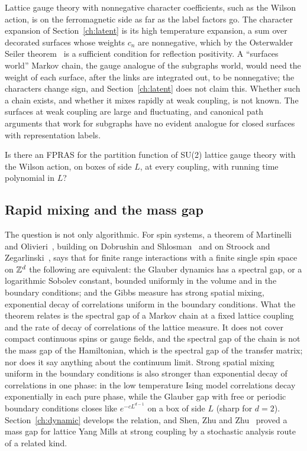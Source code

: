 Lattice gauge theory with nonnegative character coefficients, such as the Wilson action, is on the ferromagnetic side as far as the label factors go. The character expansion of Section~\ref{ch:latent} is its high temperature expansion, a sum over decorated surfaces whose weights $c_n$ are nonnegative, which by the Osterwalder Seiler theorem~\cite{OSe} is a sufficient condition for reflection positivity. A ``surfaces world'' Markov chain, the gauge analogue of the subgraphs world, would need the weight of each surface, after the links are integrated out, to be nonnegative; the characters change sign, and Section~\ref{ch:latent} does not claim this. Whether such a chain exists, and whether it mixes rapidly at weak coupling, is not known. The surfaces at weak coupling are large and fluctuating, and canonical path arguments that work for subgraphs have no evident analogue for closed surfaces with representation labels.

\begin{problem}\label{op:mixing1}
Is there an FPRAS for the partition function of SU(2) lattice gauge theory with the Wilson action, on boxes of side $L$, at every coupling, with running time polynomial in $L$?
\end{problem}

\subsection{Rapid mixing and the mass gap}

The question is not only algorithmic. For spin systems, a theorem of Martinelli and Olivieri~\cite{MO94}, building on Dobrushin and Shlosman~\cite{DS85,DS87} and on Stroock and Zegarlinski~\cite{SZ92}, says that for finite range interactions with a finite single spin space on $\mathbb{Z}^d$ the following are equivalent: the Glauber dynamics has a spectral gap, or a logarithmic Sobolev constant, bounded uniformly in the volume and in the boundary conditions; and the Gibbs measure has strong spatial mixing, exponential decay of correlations uniform in the boundary conditions. What the theorem relates is the spectral gap of a Markov chain at a fixed lattice coupling and the rate of decay of correlations of the lattice measure. It does not cover compact continuous spins or gauge fields, and the spectral gap of the chain is not the mass gap of the Hamiltonian, which is the spectral gap of the transfer matrix; nor does it say anything about the continuum limit. Strong spatial mixing uniform in the boundary conditions is also stronger than exponential decay of correlations in one phase: in the low temperature Ising model correlations decay exponentially in each pure phase, while the Glauber gap with free or periodic boundary conditions closes like $e^{-cL^{d-1}}$ on a box of side $L$ (sharp for $d=2$). Section~\ref{ch:dynamic} develops the relation, and Shen, Zhu and Zhu~\cite{SZZ} proved a mass gap for lattice Yang Mills at strong coupling by a stochastic analysis route of a related kind.

